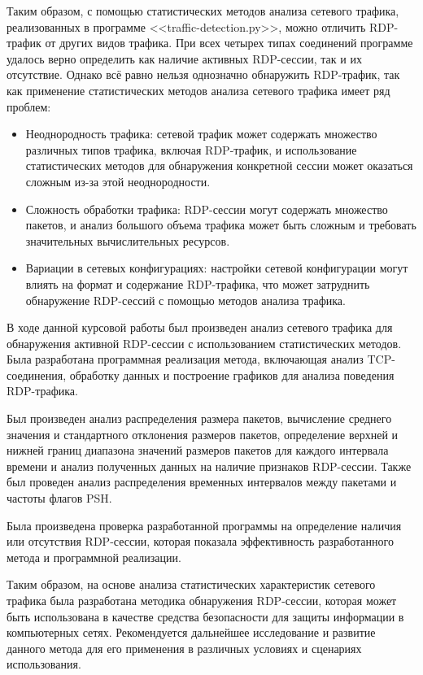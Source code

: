 \documentclass[bachelor, och, coursework]{SCWorks}
\begin{document}
Таким образом, с помощью статистических методов анализа сетевого трафика, реализованных в программе <<traffic-detection.py>>, можно
отличить RDP-трафик от других видов трафика. При всех четырех типах соединений программе удалось верно определить как наличие активных RDP-сессии,
так и их отсутствие. Однако всё равно нельзя однозначно обнаружить RDP-трафик, так как применение статистических методов анализа сетевого трафика
имеет ряд проблем:

\begin{itemize}
  \item Неоднородность трафика: сетевой трафик может содержать множество различных типов трафика, включая RDP-трафик, и использование статистических 
  методов для обнаружения конкретной сессии может оказаться сложным из-за этой неоднородности.
  \item Сложность обработки трафика: RDP-сессии могут содержать множество пакетов, и анализ большого объема трафика может быть сложным и требовать 
  значительных вычислительных ресурсов.
  \item Вариации в сетевых конфигурациях: настройки сетевой конфигурации могут влиять на формат и содержание RDP-трафика, что может затруднить 
  обнаружение RDP-сессий с помощью методов анализа трафика.
\end{itemize}

\conclusion
  
В ходе данной курсовой работы был произведен анализ сетевого трафика для обнаружения активной RDP-сессии с использованием статистических методов. 
Была разработана программная реализация метода, включающая анализ TCP-соединения, обработку данных и построение графиков для анализа поведения 
RDP-трафика. 

Был произведен анализ распределения размера пакетов, вычисление среднего значения и стандартного отклонения размеров пакетов, определение 
верхней и нижней границ диапазона значений размеров пакетов для каждого интервала времени и анализ полученных данных на наличие признаков 
RDP-сессии. Также был проведен анализ распределения временных интервалов между пакетами и частоты флагов PSH.

Была произведена проверка разработанной программы на определение наличия или отсутствия RDP-сессии, которая показала эффективность 
разработанного метода и программной реализации.

Таким образом, на основе анализа статистических характеристик сетевого трафика была разработана методика обнаружения RDP-сессии, 
которая может быть использована в качестве средства безопасности для защиты информации в компьютерных сетях. 
Рекомендуется дальнейшее исследование и развитие данного метода для его применения в различных условиях и сценариях использования.
\end{document}
